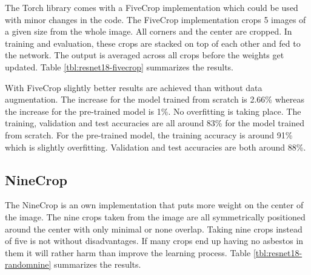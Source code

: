 The Torch library comes with a FiveCrop implementation which could be used with minor changes in the code. The FiveCrop implementation crops 5 images of a given size from the whole image. All corners and the center are cropped. In training and evaluation, these crops are stacked on top of each other and fed to the network. The output is averaged across all crops before the weights get updated. Table \ref{tbl:resnet18-fivecrop} summarizes the results.\\


\begin{table}[!h] \centering
{}
\caption{Resnet18 FiveCrop Implementation with and without pre-training. FINAL (regular) means ResNet18 with the resizing of the image instead of cropping and averaging}
\label{tbl:resnet18-fivecrop}
\end{table}

With FiveCrop slightly better results are achieved than without data augmentation. The increase for the model trained from scratch is 2.66\% whereas the increase for the pre-trained model is 1\%. No overfitting is taking place. The training, validation and test accuracies are all around 83\% for the model trained from scratch. For the pre-trained model, the training accuracy is around 91\% which is slightly overfitting. Validation and test accuracies are both around 88\%.

\subsection{NineCrop}

The NineCrop is an own implementation that puts more weight on the center of the image. The nine crops taken from the image are all symmetrically positioned around the center with only minimal or none overlap. Taking nine crops instead of five is not without disadvantages. If many crops end up having no asbestos in them it will rather harm than improve the learning process. Table \ref{tbl:resnet18-randomnine} summarizes the results.

